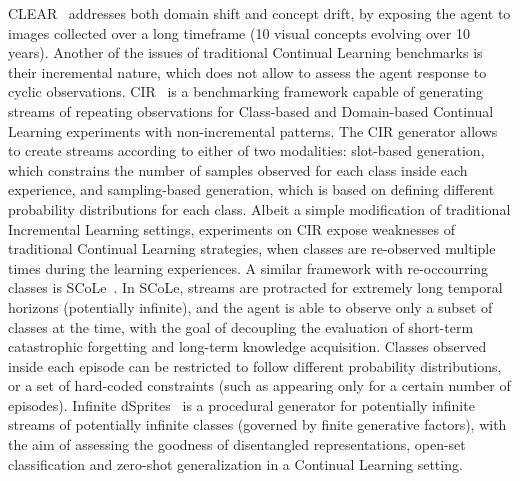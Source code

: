 CLEAR~\cite{lin2021clear} addresses both domain shift and concept drift, by exposing the agent to images collected over a long timeframe (10 visual concepts evolving over 10 years).
%
Another of the issues of traditional Continual Learning benchmarks is their incremental nature, which does not allow to assess the agent response to cyclic observations. CIR~\cite{hemati2023class} is a benchmarking framework capable of generating streams of repeating observations for Class-based and Domain-based Continual Learning experiments with non-incremental patterns. The CIR generator allows to create streams according to either of two modalities: slot-based generation, which constrains the number of samples observed for each class inside each experience, and sampling-based generation, which is based on defining different probability distributions for each class. Albeit a simple modification of traditional Incremental Learning settings, experiments on CIR expose weaknesses of traditional Continual Learning strategies, when classes are re-observed multiple times during the learning experiences.
%
A similar framework with re-occourring classes is SCoLe~\cite{lesort2023challenging}. In SCoLe, streams are protracted for extremely long temporal horizons (potentially infinite), and the agent is able to observe only a subset of classes at the time, with the goal of decoupling the evaluation of short-term catastrophic forgetting and long-term knowledge acquisition. Classes observed inside each episode can be restricted to follow different probability distributions, or a set of hard-coded constraints (such as appearing only for a certain number of episodes).
%
Infinite dSprites~\cite{dziadzio2024infinite} is a procedural generator for potentially infinite streams of potentially infinite classes (governed by finite generative factors), with the aim of assessing the goodness of disentangled representations, open-set classification and zero-shot generalization in a Continual Learning setting.

